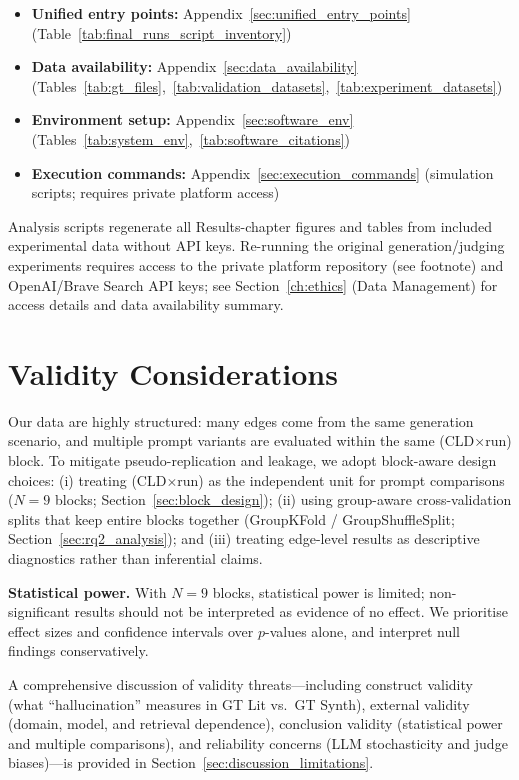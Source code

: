 \begin{itemize}[noitemsep]
    \item \textbf{Unified entry points:} Appendix~\ref{sec:unified_entry_points} (Table~\ref{tab:final_runs_script_inventory})
    \item \textbf{Data availability:} Appendix~\ref{sec:data_availability} (Tables~\ref{tab:gt_files},~\ref{tab:validation_datasets},~\ref{tab:experiment_datasets})
    \item \textbf{Environment setup:} Appendix~\ref{sec:software_env} (Tables~\ref{tab:system_env},~\ref{tab:software_citations})
    \item \textbf{Execution commands:} Appendix~\ref{sec:execution_commands} (simulation scripts; requires private platform access)
\end{itemize}

\noindent Analysis scripts regenerate all Results-chapter figures and tables from included experimental data without API keys. Re-running the original generation/judging experiments requires access to the private platform repository (see footnote) and OpenAI/Brave Search API keys; see Section~\ref{ch:ethics} (Data Management) for access details and data availability summary.

\section{Validity Considerations}
\label{sec:threats_to_validity}

Our data are highly structured: many edges come from the same generation scenario, and multiple prompt variants are evaluated within the same (CLD$\times$run) block. To mitigate pseudo-replication and leakage, we adopt block-aware design choices: (i) treating (CLD$\times$run) as the independent unit for prompt comparisons ($N=9$ blocks; Section~\ref{sec:block_design}); (ii) using group-aware cross-validation splits that keep entire blocks together (GroupKFold / GroupShuffleSplit; Section~\ref{sec:rq2_analysis}); and (iii) treating edge-level results as descriptive diagnostics rather than inferential claims.

\textbf{Statistical power.} With $N=9$ blocks, statistical power is limited; non-significant results should not be interpreted as evidence of no effect. We prioritise effect sizes and confidence intervals over $p$-values alone, and interpret null findings conservatively.

A comprehensive discussion of validity threats---including construct validity (what ``hallucination'' measures in GT Lit vs.\ GT Synth), external validity (domain, model, and retrieval dependence), conclusion validity (statistical power and multiple comparisons), and reliability concerns (LLM stochasticity and judge biases)---is provided in Section~\ref{sec:discussion_limitations}.